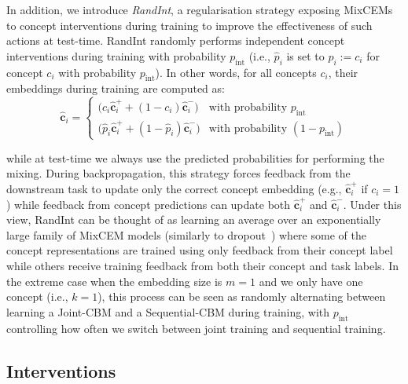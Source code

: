 In addition, we introduce \textit{RandInt}, a regularisation strategy exposing MixCEMs to concept interventions during training to improve the effectiveness of such actions at test-time. RandInt randomly performs independent concept interventions during training with probability $p_\text{int}$ (i.e., $\hat{p}_i$ is set to $\hat{p}_i := c_i$ for concept $c_i$ with probability $p_\text{int}$). In other words, for all concepts $c_i$, their embeddings during training are computed as:
\[
    \hat{\mathbf{c}}_i = \begin{cases}
        \big(c_i \hat{\mathbf{c}}^+_i + (1 - c_i) \hat{\mathbf{c}}^-_i\big) & \text{with probability } p_\text{int} \\
        \big(\hat{p}_i \hat{\mathbf{c}}^+_i + (1 - \hat{p}_i) \hat{\mathbf{c}}^-_i\big) & \text{with probability } (1 - p_\text{int})
    \end{cases}
\]

while at test-time we always use the predicted probabilities for performing the mixing. During backpropagation, this strategy forces feedback from the downstream task to update only the correct concept embedding (e.g., $\hat{\mathbf{c}}^+_i$ if $c_i = 1$) while feedback from concept predictions can update both $\hat{\mathbf{c}}^+_i$ and $\hat{\mathbf{c}}^-_i$. Under this view, RandInt can be thought of as learning an average over an exponentially large family of MixCEM models (similarly to dropout~\citep{srivastava2014dropout}) where some of the concept representations are trained using only feedback from their concept label while others receive training feedback from both their concept and task labels. In the extreme case when the embedding size is $m = 1$ and we only have one concept (i.e., $k = 1$), this process can be seen as randomly alternating between learning a Joint-CBM and a Sequential-CBM during training, with $p_\text{int}$ controlling how often we switch between joint training and sequential training.


\subsection{Interventions}

